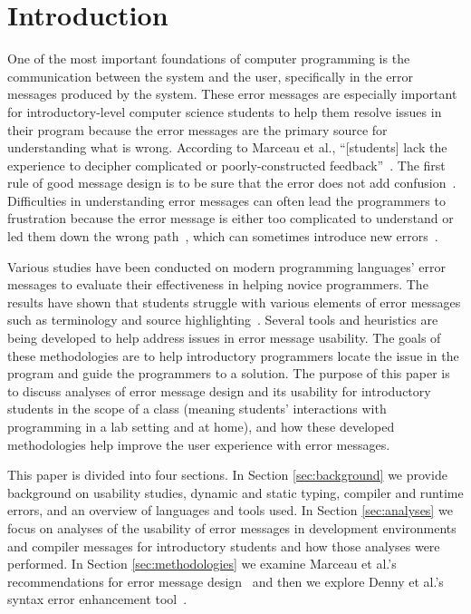 \documentclass{sig-alternate}
\begin{document}
\section{Introduction}\label{sec:intro}
One of the most important foundations of computer programming is the communication between the system and the user, specifically in the error messages produced by the system.
These error messages are especially important for introductory-level computer science students to help them resolve issues in their program because the error messages are the primary source for understanding what is wrong.
According to Marceau et al., ``[students] lack the experience to decipher complicated or poorly-constructed feedback''~\cite{Marceau:2011:MEE:1953163.1953308}.
The first rule of good message design is to be sure that the error does not add confusion~\cite{Isa:1983:MOE:800045.801583}.
Difficulties in understanding error messages can often lead the programmers to frustration because the error message is either too complicated to understand or led them down the wrong path~\cite{Marceau:2011:MYL:2048237.2048241}, which can sometimes introduce new errors~\cite{Denny:2014:ESE:2591708.2591748}.

Various studies have been conducted on modern programming languages' error messages to evaluate their effectiveness in helping novice programmers.
The results have shown that students struggle with various elements of error messages such as terminology and source highlighting~\cite{Denny:2014:ESE:2591708.2591748,Traver:2010}.
Several tools and heuristics are being developed to help address issues in error message usability.
The goals of these methodologies are to help introductory programmers locate the issue in the program and guide the programmers to a solution.
The purpose of this paper is to discuss analyses of error message design and its usability for introductory students in the scope of a class (meaning students' interactions with programming in a lab setting and at home), and how these developed methodologies help improve the user experience with error messages. 

This paper is divided into four sections.
In Section \ref{sec:background} we provide background on usability studies, dynamic and static typing, compiler and runtime errors, and an overview of languages and tools used.
In Section \ref{sec:analyses} we focus on analyses of the usability of error messages in development environments and compiler messages for introductory students and how those analyses were performed.
In Section \ref{sec:methodologies} we examine Marceau et al.'s recommendations for error message design~\cite{Marceau:2011:MYL:2048237.2048241} and then we explore Denny et al.'s syntax error enhancement tool~\cite{Denny:2014:ESE:2591708.2591748}.
\end{document}

